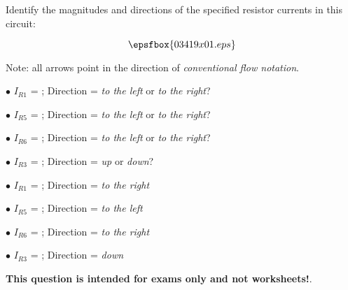 

Identify the magnitudes and directions of the specified resistor currents in this circuit:

$$\epsfbox{03419x01.eps}$$

Note: all arrows point in the direction of {\it conventional flow notation}.

\medskip
\item{$\bullet$} $I_{R1}$ = \underbar{\hskip 70pt} ; Direction = {\it to the left} or {\it to the right}?
\vskip 5pt
\item{$\bullet$} $I_{R5}$ = \underbar{\hskip 70pt} ; Direction = {\it to the left} or {\it to the right}?
\vskip 5pt
\item{$\bullet$} $I_{R6}$ = \underbar{\hskip 70pt} ; Direction = {\it to the left} or {\it to the right}?
\vskip 5pt
\item{$\bullet$} $I_{R3}$ = \underbar{\hskip 70pt} ; Direction = {\it up} or {\it down}?
\medskip







\medskip
\item{$\bullet$} $I_{R1}$ =  ; Direction = {\it to the right}
\vskip 5pt
\item{$\bullet$} $I_{R5}$ =  ; Direction = {\it to the left}
\vskip 5pt
\item{$\bullet$} $I_{R6}$ =  ; Direction = {\it to the right}
\vskip 5pt
\item{$\bullet$} $I_{R3}$ =  ; Direction = {\it down}
\medskip







{\bf This question is intended for exams only and not worksheets!}.



